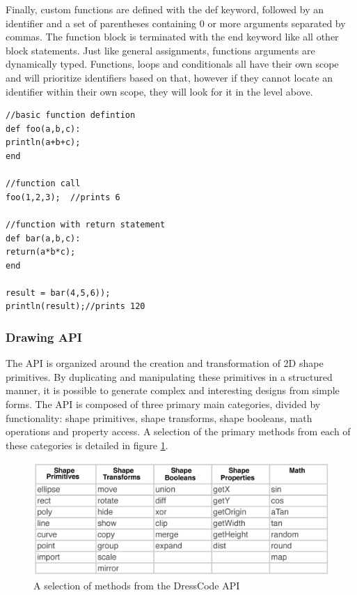 Finally, custom functions are defined with the def keyword, followed by an identifier and a set of parentheses containing 0 or more arguments separated by commas. The function block is terminated with the end keyword like all other block statements. Just like general assignments, functions arguments are dynamically typed. Functions, loops and conditionals all have their own scope and will prioritize identifiers based on that, however if they cannot locate an identifier within their own scope, they will look for it in the level above.
\begin{center}
\begin{lstlisting}
//basic function defintion
def foo(a,b,c):
println(a+b+c);
end

//function call
foo(1,2,3);  //prints 6

//function with return statement
def bar(a,b,c):
return(a*b*c);
end

result = bar(4,5,6)); 
println(result);//prints 120
\end{lstlisting}
\end{center}

\subsubsection{Drawing API}
 The API is organized around the creation and transformation of 2D shape primitives. By duplicating and manipulating these primitives in a structured manner, it is possible to generate complex and interesting designs from simple forms. The API is composed of three primary main categories, divided by functionality: shape primitives, shape transforms, shape booleans, math operations and property access. A selection of the primary methods from each of these categories is detailed in figure \ref{fig:api_table}. 

  \begin{center}
\begin{figure}[h!]
\includegraphics[width=6.5in]{images/api_table.png}
\caption{A selection of methods from the DressCode API}
\label{fig:api_table}
\end{figure}
\end{center}
